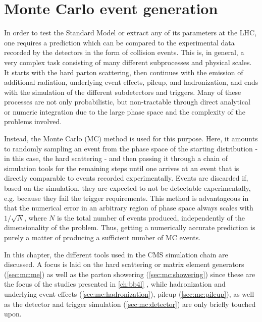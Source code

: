 \chapter{Monte Carlo event generation}
\label{ch:mc}


In order to test the Standard Model or extract any of its parameters at the LHC, one requires a prediction which can be compared to the experimental data recorded by the detectors in the form of collision events. This is, in general, a very complex task consisting of many different subprocesses and physical scales. It starts with the hard parton scattering, then continues with the emission of additional radiation, underlying event effects, pileup, and hadronization, and ends with the simulation of the different subdetectors and triggers. Many of these processes are not only probabilistic, but non-tractable through direct analytical or numeric integration due to the large phase space and the complexity of the problems involved.

Instead, the Monte Carlo (MC) method is used for this purpose. Here, it amounts to randomly sampling an event from the phase space of the starting distribution - in this case, the hard scattering - and then passing it through a chain of simulation tools for the remaining steps until one arrives at an event that is directly comparable to events recorded experimentally. Events are discarded if, based on the simulation, they are expected to not be detectable experimentally, e.g. because they fail the trigger requirements. This method is advantageous in that the numerical error in an arbitrary region of phase space always scales with $1/\sqrt{N}$, where $N$ is the total number of events produced, independently of the dimensionality of the problem. Thus, getting a numerically accurate prediction is purely a matter of producing a sufficient number of MC events.

In this chapter, the different tools used in the CMS simulation chain are discussed. A focus is laid on the hard scattering or matrix element generators (\cref{sec:mc:me}) as well as the parton showering (\cref{sec:mc:showering}) since these are the focus of the studies presented in \cref{ch:bb4l} , while hadronization and underlying event effects (\cref{sec:mc:hadronization}), pileup (\cref{sec:mc:pileup}), as well as the detector and trigger simulation (\cref{sec:mc:detector}) are only briefly touched upon. 

